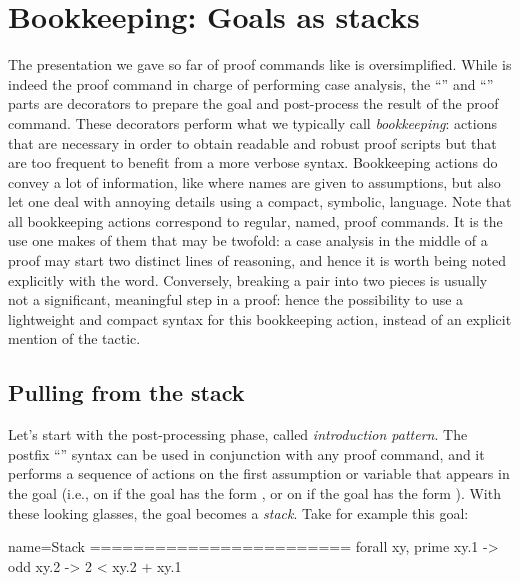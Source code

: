 \section{Bookkeeping: Goals as stacks}\label{ssec:stack}

The presentation we gave so far of proof commands like 
is oversimplified.  While  is indeed the proof command in
charge of performing case analysis, the ``'' and ``\C{=> [|m]}''
parts are decorators to prepare the goal and post-process the result of
the proof command.  These decorators perform what we typically call
\emph{bookkeeping}: actions that are necessary in order to obtain readable and
robust proof scripts but that are too frequent to benefit from a more verbose
syntax.  Bookkeeping actions do convey a lot of information, like where
names are given to assumptions, but also let one deal with annoying details
using a compact, symbolic, language.  Note that all bookkeeping actions
correspond to regular, named, proof commands.  It is the use one makes of them
that may be twofold: a case analysis in the middle of a proof may start two
distinct lines of reasoning, and hence it is worth being noted explicitly with
the  word. Conversely, breaking a pair into two pieces is
usually not a significant, meaningful step in a proof: hence the
possibility to use a lightweight and compact syntax for this bookkeeping
action, instead of an explicit mention of the  tactic.

\subsection{Pulling from the stack}

Let's start with the post-processing phase, called \emph{introduction pattern}.
The postfix ``'' syntax can be used in conjunction with any proof
command, and it performs a sequence of actions on the first
assumption or variable that appears in the goal (i.e., on
 if the goal has the form , or on
 if the goal has the form ).
With these looking glasses, the goal becomes a
\emph{stack}. Take for example this goal:

\begin{coqout}{name=Stack}{}
========================
forall xy, prime xy.1 -> odd xy.2 -> 2 < xy.2 + xy.1
\end{coqout}

